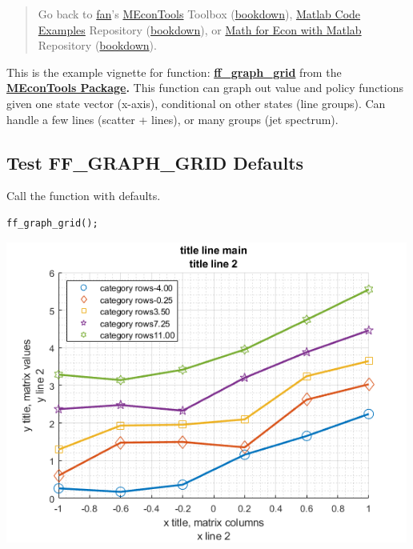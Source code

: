 \documentclass[
]{book}
\begin{document}
\begin{quote}
Go back to \href{http://fanwangecon.github.io/}{fan}'s \href{https://fanwangecon.github.io/MEconTools/}{MEconTools} Toolbox (\href{https://fanwangecon.github.io/MEconTools/bookdown}{bookdown}), \href{https://fanwangecon.github.io/M4Econ/}{Matlab Code Examples} Repository (\href{https://fanwangecon.github.io/M4Econ/bookdown}{bookdown}), or \href{https://fanwangecon.github.io/Math4Econ/}{Math for Econ with Matlab} Repository (\href{https://fanwangecon.github.io/Math4Econ/bookdown}{bookdown}).
\end{quote}

This is the example vignette for function:
\href{https://github.com/FanWangEcon/MEconTools/blob/master/MEconTools/graph/ff_graph_grid.m}{\textbf{ff\_graph\_grid}}
from the \href{https://fanwangecon.github.io/MEconTools/}{\textbf{MEconTools
Package}}\textbf{.} This function
can graph out value and policy functions given one state vector
(x-axis), conditional on other states (line groups). Can handle a few
lines (scatter + lines), or many groups (jet spectrum).

\hypertarget{test-ff_graph_grid-defaults}{%
\subsection{Test FF\_GRAPH\_GRID Defaults}\label{test-ff_graph_grid-defaults}}

Call the function with defaults.

\begin{verbatim}
ff_graph_grid();
\end{verbatim}

\includegraphics[width=5.20833in,height=\textheight]{img/fx_graph_grid_images/figure_0.png}
\end{document}
